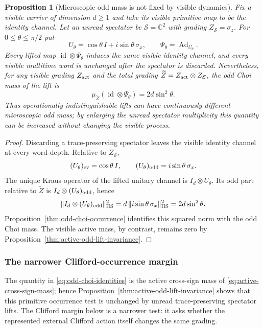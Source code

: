 \documentclass[11pt]{article}
\numberwithin{equation}{section}
\newtheorem{proposition}[theorem]{Proposition}
\theoremstyle{definition}
\theoremstyle{remark}
\newcommand{\C}{\mathbb C}
\newcommand{\HS}{\mathrm{HS}}
\newcommand{\norm}[1]{\lVert#1\rVert}
\begin{document}
\begin{proposition}[Microscopic odd mass is not fixed by visible dynamics]
\label{cth:microscopic-odd-lift}
Fix a visible carrier of dimension $d\ge1$ and take its visible primitive map
to be the identity channel.  Let an unread spectator be $\mathcal S=\C^2$ with
grading $Z_{\mathcal S}=\sigma_z$.  For $0\le\theta\le\pi/2$ put
\[
U_\theta=\cos\theta\,I+i\sin\theta\,\sigma_x,
\qquad
\Psi_\theta=\operatorname{Ad}_{U_\theta}.
\]
Every lifted map $\operatorname{id}\otimes\Psi_\theta$ induces the same
visible identity channel, and every visible multitime word is unchanged after
the spectator is discarded.  Nevertheless, for any visible grading
$Z_{\rm act}$ and the total grading
$\widetilde Z=Z_{\rm act}\otimes Z_{\mathcal S}$, the odd Choi mass of the
lift is
\begin{equation}
\mu_{\widetilde Z}
 (\operatorname{id}\otimes\Psi_\theta)
=2d\sin^2\theta.
\label{eq:microscopic-odd-lift-family}
\end{equation}
Thus operationally indistinguishable lifts can have continuously different
microscopic odd mass; by enlarging the unread spectator multiplicity this
quantity can be increased without changing the visible process.
\end{proposition}

\begin{proof}
Discarding a trace-preserving spectator leaves the visible identity channel at
every word depth.  Relative to $Z_{\mathcal S}$,
\[
(U_\theta)_{\rm ev}=\cos\theta\,I,
\qquad
(U_\theta)_{\rm odd}=i\sin\theta\,\sigma_x.
\]
The unique Kraus operator of the lifted unitary channel is
$I_d\otimes U_\theta$.  Its odd part relative to $\widetilde Z$ is
$I_d\otimes(U_\theta)_{\rm odd}$, hence
\[
\norm{I_d\otimes(U_\theta)_{\rm odd}}_{\HS}^2
=d\,\norm{i\sin\theta\,\sigma_x}_{\HS}^2
=2d\sin^2\theta.
\]
Proposition~\ref{thm:odd-choi-occurrence} identifies this squared norm with the
odd Choi mass.  The visible active mass, by contrast, remains zero by
Proposition~\ref{thm:active-odd-lift-invariance}.
\end{proof}


\subsubsection{The narrower Clifford-occurrence margin}

The quantity in \eqref{eq:odd-choi-identities} is the active cross-sign mass
of \eqref{eq:active-cross-sign-mass}; hence
Proposition~\ref{thm:active-odd-lift-invariance} shows that this primitive
occurrence test is unchanged by unread trace-preserving spectator lifts.
The Clifford margin below is a narrower test: it asks whether the represented
external Clifford action itself changes the same grading.
\end{document}
